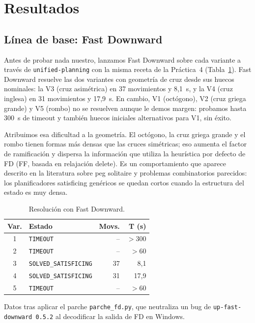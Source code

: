 \documentclass[conference,a4paper]{IEEEtran}
\begin{document}
\section{Resultados}
\label{sec:resultados}


\subsection{Línea de base: Fast Downward}

Antes de probar nada nuestro, lanzamos Fast Downward sobre cada variante
a través de \texttt{unified-planning} con la misma receta de la
Práctica~4 (Tabla~\ref{tab:fd-resultados}). Fast Downward resuelve las
dos variantes con geometría de cruz desde sus huecos nominales: la V3
(cruz asimétrica) en 37 movimientos y 8,1~s, y la V4 (cruz inglesa)
en 31 movimientos y 17,9~s. En cambio, V1 (octógono), V2 (cruz griega
grande) y V5 (rombo) no se resuelven aunque le demos margen: probamos
hasta 300~s de timeout y también huecos iniciales alternativos para V1,
sin éxito.

Atribuimos esa dificultad a la geometría. El octógono, la cruz griega
grande y el rombo tienen formas más densas que las cruces simétricas;
eso aumenta el factor de ramificación y dispersa la información que
utiliza la heurística por defecto de FD (FF, basada en relajación
delete). Es un comportamiento que aparece descrito en la literatura
sobre peg solitaire y problemas combinatorios parecidos: los
planificadores satisficing genéricos se quedan cortos cuando la
estructura del estado es muy densa.

\begin{table}[!htbp]
\caption{Resolución con Fast Downward.}
\label{tab:fd-resultados}
\centering
\begin{tabular}{clrr}
\toprule
\textbf{Var.} & \textbf{Estado} & \textbf{Movs.} & \textbf{T (s)} \\
\midrule
1 & \texttt{TIMEOUT}                  &  -- & $>$300 \\
2 & \texttt{TIMEOUT}                  &  -- & $>$60  \\
3 & \texttt{SOLVED\_SATISFICING}      & 37  & 8,1   \\
4 & \texttt{SOLVED\_SATISFICING}      & 31  & 17,9  \\
5 & \texttt{TIMEOUT}                  &  -- & $>$60  \\
\bottomrule
\end{tabular}
\par\smallskip
\footnotesize Datos tras aplicar el parche \texttt{parche\_fd.py}, que
neutraliza un bug de \texttt{up-fast-downward 0.5.2} al decodificar la
salida de FD en Windows.
\end{table}
\end{document}
